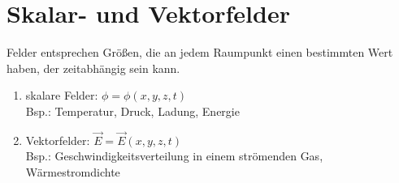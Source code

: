 \section{Skalar- und Vektorfelder}
Felder entsprechen Größen, die an jedem Raumpunkt einen bestimmten Wert haben, der zeitabhängig sein kann.\\
\begin{enumerate}
\item skalare Felder: $\phi=\phi(x,y,z,t)$\\ \linebreak
Bsp.: Temperatur, Druck, Ladung, Energie
\item Vektorfelder: $\vec{E}=\vec{E}(x,y,z,t)$\\ \linebreak
Bsp.: Geschwindigkeitsverteilung in einem strömenden Gas, Wärmestromdichte
\end{enumerate}

